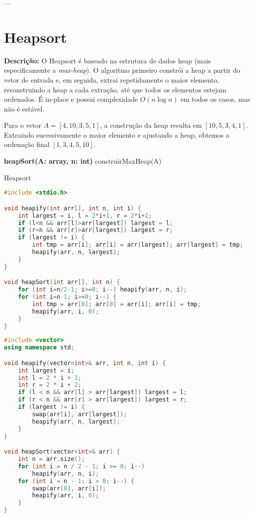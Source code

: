 ---


\section{Heapsort}

\textbf{Descrição:} O Heapsort é baseado na estrutura de dados heap (mais especificamente a \textit{max-heap}). O algoritmo primeiro constrói a heap a partir do vetor de entrada e, em seguida, extrai repetidamente o maior elemento, reconstruindo a heap a cada extração, até que todos os elementos estejam ordenados. É in-place e possui complexidade $O(n \log n)$ em todos os casos, mas não é estável.


\begin{exmp}
Para o vetor $A = [4, 10, 3, 5, 1]$, a construção da heap resulta em $[10, 5, 3, 4, 1]$.  
Extraindo sucessivamente o maior elemento e ajustando a heap, obtemos a ordenação final $[1, 3, 4, 5, 10]$.
\end{exmp}

\begin{algorithm}[H]
\DontPrintSemicolon
\textbf{heapSort(A: array, n: int)}\;
construirMaxHeap(A)\;
\caption{Heapsort}
\label{lab:alg-heapSort}
\end{algorithm}

\begin{lstlisting}[language=C, caption={Implementação do Heapsort em C}, label=code:heapSort]
#include <stdio.h>

void heapify(int arr[], int n, int i) {
    int largest = i, l = 2*i+1, r = 2*i+2;
    if (l<n && arr[l]>arr[largest]) largest = l;
    if (r<n && arr[r]>arr[largest]) largest = r;
    if (largest != i) {
        int tmp = arr[i]; arr[i] = arr[largest]; arr[largest] = tmp;
        heapify(arr, n, largest);
    }
}

void heapSort(int arr[], int n) {
    for (int i=n/2-1; i>=0; i--) heapify(arr, n, i);
    for (int i=n-1; i>=0; i--) {
        int tmp = arr[0]; arr[0] = arr[i]; arr[i] = tmp;
        heapify(arr, i, 0);
    }
}
\end{lstlisting}

\begin{lstlisting}[language=C++,caption={Heap sort em C++},captionpos=t]
#include <vector>
using namespace std;

void heapify(vector<int>& arr, int n, int i) {
    int largest = i;
    int l = 2 * i + 1;
    int r = 2 * i + 2;
    if (l < n && arr[l] > arr[largest]) largest = l;
    if (r < n && arr[r] > arr[largest]) largest = r;
    if (largest != i) {
        swap(arr[i], arr[largest]);
        heapify(arr, n, largest);
    }
}

void heapSort(vector<int>& arr) {
    int n = arr.size();
    for (int i = n / 2 - 1; i >= 0; i--)
        heapify(arr, n, i);
    for (int i = n - 1; i > 0; i--) {
        swap(arr[0], arr[i]);
        heapify(arr, i, 0);
    }
}
\end{lstlisting}

